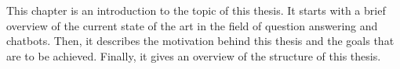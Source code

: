 
This chapter is an introduction to the topic of this thesis. It starts with a brief overview of the current state of the art in the field of question answering and chatbots. Then, it describes the motivation behind this thesis and the goals that are to be achieved. Finally, it gives an overview of the structure of this thesis.
